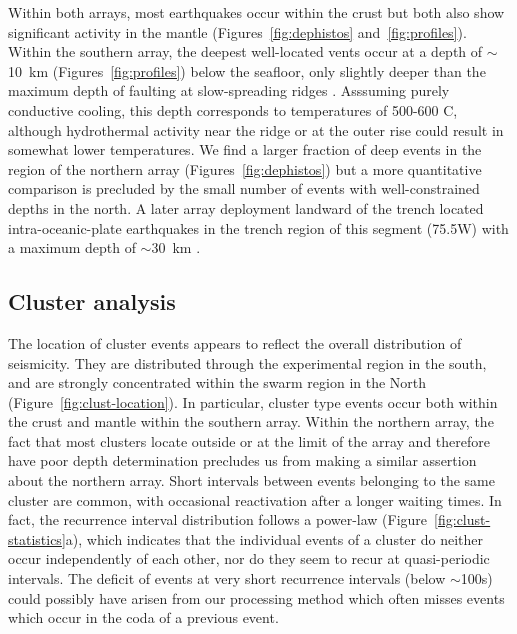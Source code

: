 \documentclass[reviewcopy]{elsarticle}
\begin{document}
Within both arrays, most earthquakes occur within the crust but both
also show significant activity in the mantle
(Figures~\ref{fig:dephistos} and~\ref{fig:profiles}). Within the southern array, the deepest
well-located vents occur at a depth of
$\sim$10~km (Figures~\ref{fig:profiles}) below the seafloor, only slightly deeper than the
maximum depth of faulting at slow-spreading ridges
\citep[e.g.][]{toomey88,tilmann04}.  Asssuming purely conductive
cooling, this depth corresponds to temperatures of 500-600\dg
C, although hydrothermal activity  near the ridge or at the outer rise
could result in somewhat lower
 temperatures.  We find a
larger fraction of deep events in the region of the northern array
(Figures~\ref{fig:dephistos}) but
a more quantitative comparison is precluded by the small number of
events with well-constrained depths in the north. A later array
deployment landward of the trench located intra-oceanic-plate
earthquakes in the trench region of this segment (75.5\dg W) with a maximum depth of
$\sim$30~km \citep{lange07}.

\subsection{Cluster analysis}

The location of cluster events appears to reflect the overall
distribution of seismicity.  They are distributed through the
experimental region in the south, and are strongly concentrated within
the swarm region in the North (Figure~\ref{fig:clust-location}).  In
particular, cluster type events occur both within the crust and mantle
within the southern array.  Within the northern array, the fact that
most clusters locate outside or at the limit of the array and therefore
have poor depth determination precludes us from making a similar
assertion about the northern array.   Short intervals between events
belonging to the same cluster are common, with occasional reactivation
after a longer waiting times.  In fact, the recurrence interval
distribution follows a power-law (Figure~\ref{fig:clust-statistics}a),
which indicates that the individual events of a cluster do neither occur
independently of each other, nor do they seem to recur at
quasi-periodic intervals.  The deficit of events at very short
recurrence intervals (below $\sim$100s) could possibly have arisen from our
processing method which often  misses events which occur in the
coda of a previous event.
\end{document}
